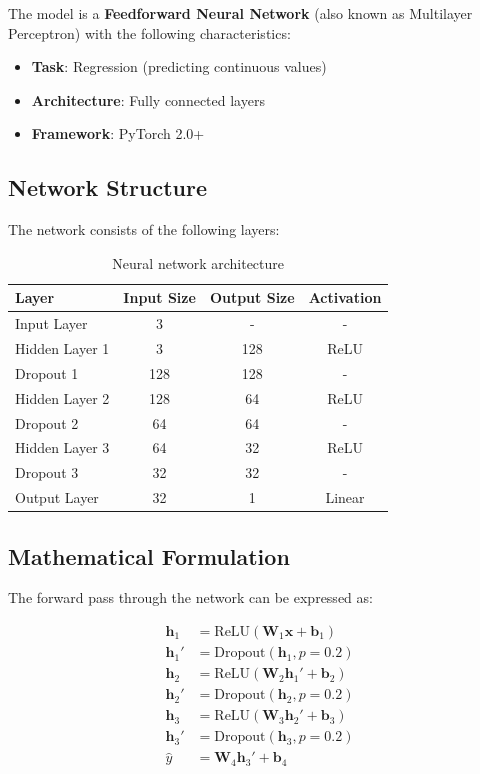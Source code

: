 \documentclass[12pt,a4paper]{article}
\begin{document}
The model is a \textbf{Feedforward Neural Network} (also known as Multilayer Perceptron) with the following characteristics:
\begin{itemize}
    \item \textbf{Task}: Regression (predicting continuous values)
    \item \textbf{Architecture}: Fully connected layers
    \item \textbf{Framework}: PyTorch 2.0+
\end{itemize}

\subsection{Network Structure}

The network consists of the following layers:

\begin{table}[H]
\centering
\begin{tabular}{@{}lccc@{}}
\toprule
\textbf{Layer} & \textbf{Input Size} & \textbf{Output Size} & \textbf{Activation} \\ \midrule
Input Layer & 3 & - & - \\
Hidden Layer 1 & 3 & 128 & ReLU \\
Dropout 1 & 128 & 128 & - \\
Hidden Layer 2 & 128 & 64 & ReLU \\
Dropout 2 & 64 & 64 & - \\
Hidden Layer 3 & 64 & 32 & ReLU \\
Dropout 3 & 32 & 32 & - \\
Output Layer & 32 & 1 & Linear \\ \bottomrule
\end{tabular}
\caption{Neural network architecture}
\label{tab:architecture}
\end{table}

\subsection{Mathematical Formulation}

The forward pass through the network can be expressed as:

\begin{align}
    \mathbf{h}_1 &= \text{ReLU}(\mathbf{W}_1 \mathbf{x} + \mathbf{b}_1) \\
    \mathbf{h}_1' &= \text{Dropout}(\mathbf{h}_1, p=0.2) \\
    \mathbf{h}_2 &= \text{ReLU}(\mathbf{W}_2 \mathbf{h}_1' + \mathbf{b}_2) \\
    \mathbf{h}_2' &= \text{Dropout}(\mathbf{h}_2, p=0.2) \\
    \mathbf{h}_3 &= \text{ReLU}(\mathbf{W}_3 \mathbf{h}_2' + \mathbf{b}_3) \\
    \mathbf{h}_3' &= \text{Dropout}(\mathbf{h}_3, p=0.2) \\
    \hat{y} &= \mathbf{W}_4 \mathbf{h}_3' + \mathbf{b}_4
\end{align}
\end{document}
